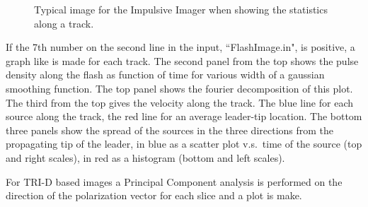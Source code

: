 \begin{figure}[th]
	\caption{Typical image for the Impulsive Imager when showing the statistics along a track.}	 
\end{figure}

If the 7th number on the second line in the input, ``FlashImage.in", is positive, a graph like  is made for each track. The second panel from the top shows the pulse density along the flash as function of time for various width of a gaussian smoothing function. The top panel shows the fourier decomposition of this plot. The third from the top gives the velocity along the track. The blue line for each source along the track, the red line for an average leader-tip location. The bottom three panels show the spread of the sources in the three directions from the propagating tip of the leader, in blue as a scatter plot v.s.\ time of the source (top and right scales), in red as a histogram (bottom and left scales).

For TRI-D based images a Principal Component analysis is performed on the direction of the polarization vector for each slice and a plot is make.

